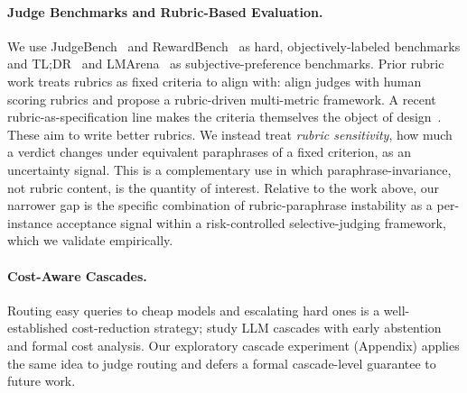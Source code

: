 \paragraph{Judge Benchmarks and Rubric-Based Evaluation.}
We use JudgeBench~\citep{tan2024judgebench} and RewardBench~\citep{lambert2024rewardbench} as hard, objectively-labeled benchmarks and TL;DR~\citep{stiennon2020learning} and LMArena~\citep{zheng2023judging} as subjective-preference benchmarks. Prior rubric work treats rubrics as fixed criteria to align with: \citet{hong2026from} align judges with human scoring rubrics and \citet{anghel2025pearl} propose a rubric-driven multi-metric framework. A recent rubric-as-specification line makes the criteria themselves the object of design~\citep{roy2026premise,rao2026autorubric}. These aim to write better rubrics. We instead treat \emph{rubric sensitivity}, how much a verdict changes under equivalent paraphrases of a fixed criterion, as an uncertainty signal. This is a complementary use in which paraphrase-invariance, not rubric content, is the quantity of interest. Relative to the work above, our narrower gap is the specific combination of rubric-paraphrase instability as a per-instance acceptance signal within a risk-controlled selective-judging framework, which we validate empirically.

\paragraph{Cost-Aware Cascades.}
Routing easy queries to cheap models and escalating hard ones is a well-established cost-reduction strategy; \citet{zellinger2025costsaving} study LLM cascades with early abstention and formal cost analysis. Our exploratory cascade experiment (Appendix) applies the same idea to judge routing and defers a formal cascade-level guarantee to future work.
